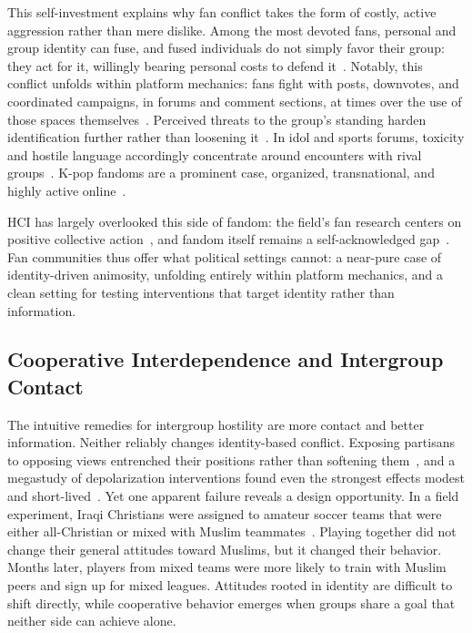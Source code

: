 \documentclass[manuscript,screen,review,anonymous]{acmart}
\begin{document}
This self-investment explains why fan conflict takes the form of costly,
active aggression rather than mere dislike. Among the most devoted fans,
personal and group identity can fuse, and fused individuals do not simply
favor their group: they act for it, willingly bearing personal costs to
defend it~\cite{swann2009, swann2012}. Notably, this conflict unfolds within
platform mechanics: fans fight with posts, downvotes, and coordinated
campaigns, in forums and comment sections, at times over the use of those
spaces themselves~\cite{yin2020, marwick2021}. Perceived threats to the
group's standing harden identification further rather than loosening
it~\cite{branscombe1999}. In idol and sports forums, toxicity and hostile
language accordingly concentrate around encounters with rival
groups~\cite{cleland2014, rathje2021}. K-pop fandoms are a prominent case,
organized, transnational, and highly active online~\cite{jin2016,
mclaren2020}.

HCI has largely overlooked this side of fandom: the field's fan research
centers on positive collective action~\cite{fiesler2016}, and fandom itself
remains a self-acknowledged gap~\cite{fiesler2016}. Fan communities thus
offer what political settings cannot: a near-pure case of identity-driven
animosity, unfolding entirely within platform mechanics, and a clean setting
for testing interventions that target identity rather than information.

\subsection{Cooperative Interdependence and Intergroup Contact}

The intuitive remedies for intergroup hostility are more contact and better
information. Neither reliably changes identity-based conflict. Exposing
partisans to opposing views entrenched their positions rather than softening
them~\cite{bail2018}, and a megastudy of depolarization interventions found
even the strongest effects modest and short-lived~\cite{voelkel2023}. Yet one
apparent failure reveals a design opportunity. In a field experiment, Iraqi
Christians were assigned to amateur soccer teams that were either
all-Christian or mixed with Muslim teammates~\cite{mousa2020}. Playing
together did not change their general attitudes toward Muslims, but it
changed their behavior. Months later, players from mixed teams were more
likely to train with Muslim peers and sign up for mixed leagues. Attitudes
rooted in identity are difficult to shift directly, while cooperative
behavior emerges when groups share a goal that neither side can achieve
alone.
\end{document}
